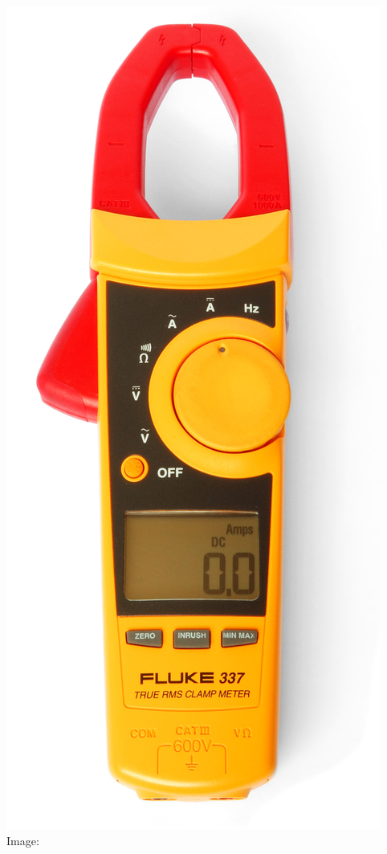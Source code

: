 \documentclass[fleqn]{beamer} %
\begin{document}
\begin{frame}
\begin{multicols}{3}
		\includegraphics[scale=.20]{Clampmeter_Fluke_337}
		\tiny{Image: \href{https://commons.wikimedia.org/wiki/File:Clampmeter_Fluke_337.jpg}{}}

		\end{multicols}	


	\end{frame}
\end{document}
